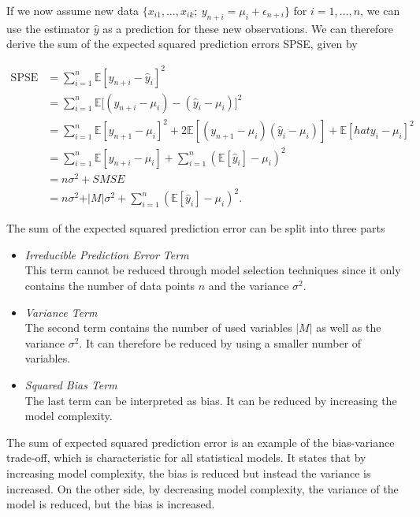 If we now assume new data $\{ x_{i1}, \dots, x_{ik}; \ y_{n+i} = \mu_i + \epsilon_{n+i}\}$ for $i = 1, \dots, n$, we can use the estimator $\hat  y$ as a prediction for these new observations. We can therefore derive the sum of the expected squared prediction errors SPSE, given by

\begin{equation}
\begin{split}
	\text{SPSE} &= \sum_{i=1}^n \mathbb{E}[y_{n+i} - \hat y_i]^2 \\ 
				&= \sum_{i=1}^n \mathbb{E}\big[(y_{n+i} - \mu_i) - (\hat y_i - \mu_i)\big]^2 \\ 
				&= \sum_{i=1}^n \mathbb{E}[y_{n+1} - \mu_i]^2 + 2\mathbb{E}[(y_{n+1} - \mu_i)(\hat y_i - \mu_i)] + \mathbb{E}[hat y_i - \mu_i]^2 \\
				&= \sum_{i=1}^n\mathbb{E}[y_{n+i} - \mu_i] + \sum_{i=1}^n(\mathbb{E}[\hat y_i] - \mu_i)^2 \\ 
				&= n\sigma^2 + SMSE \\ 
				&= n\sigma^2 + \vert M \vert \sigma^2 + \sum_{i=1}^n(\mathbb{E}[\hat y_i] - \mu_i)^2.
\end{split}
\end{equation}


The sum of the expected squared prediction error can be split into three parts

\begin{itemize}
	\item \emph{Irreducible Prediction Error Term} \\
	This term cannot be reduced through model selection techniques since it only contains the number of data points $n$ and the variance $\sigma^2$.

	\item \emph{Variance Term} \\
	The second term contains the number of used variables $\vert M \vert$ as well as the variance $\sigma^2$. It can therefore be reduced by using a smaller number of variables.
	
	\item \emph{Squared Bias Term} \\
	The last term can be interpreted as bias. It can be reduced by increasing the model complexity.
\end{itemize}

The sum of expected squared prediction error is an example of the bias-variance trade-off, which is characteristic for all statistical models. It states that by increasing model complexity, the bias is reduced but instead the variance is increased. On the other side, by decreasing model complexity, the variance of the model is reduced, but the bias is increased. \cite{bishop2006patternRecognition}

